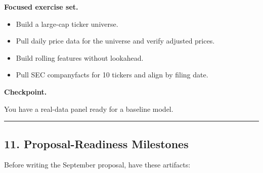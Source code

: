 \textbf{Focused exercise set.}

\begin{itemize}
\tightlist
\item
  Build a large-cap ticker universe.
\item
  Pull daily price data for the universe and verify adjusted prices.
\item
  Build rolling features without lookahead.
\item
  Pull SEC companyfacts for 10 tickers and align by filing date.
\end{itemize}

\textbf{Checkpoint.}

You have a real-data panel ready for a baseline model.

\begin{center}\rule{0.5\linewidth}{0.5pt}\end{center}

\subsection{11. Proposal-Readiness
Milestones}\label{proposal-readiness-milestones}

Before writing the September proposal, have these artifacts:

